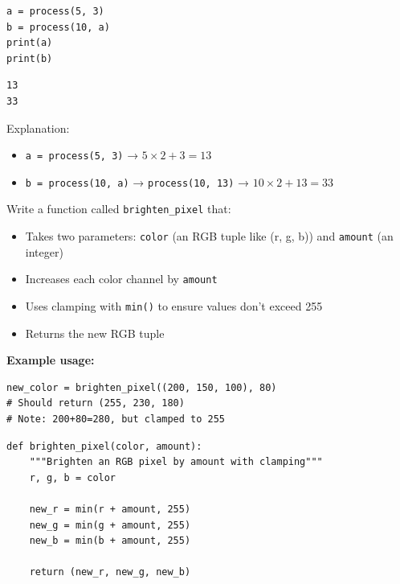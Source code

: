 \documentclass{csexam}
\begin{document}
\begin{questions}
\begin{lstlisting}
a = process(5, 3)
b = process(10, a)
print(a)
print(b)
\end{lstlisting}

\vspace{3cm}

\begin{solution}
\begin{verbatim}
13
33
\end{verbatim}
Explanation:
\begin{itemize}
    \item \texttt{a = process(5, 3)} → $5 \times 2 + 3 = 13$
    \item \texttt{b = process(10, a)} → \texttt{process(10, 13)} → $10 \times 2 + 13 = 33$
\end{itemize}
\end{solution}

\newpage

\question[12] Write a function called \texttt{brighten\_pixel} that:
\begin{itemize}
    \item Takes two parameters: \texttt{color} (an RGB tuple like (r, g, b)) and \texttt{amount} (an integer)
    \item Increases each color channel by \texttt{amount}
    \item Uses clamping with \texttt{min()} to ensure values don't exceed 255
    \item Returns the new RGB tuple
\end{itemize}

\textbf{Example usage:}
\begin{verbatim}
new_color = brighten_pixel((200, 150, 100), 80)
# Should return (255, 230, 180)
# Note: 200+80=280, but clamped to 255
\end{verbatim}

\vspace{8cm}

\begin{solution}
\begin{lstlisting}
def brighten_pixel(color, amount):
    """Brighten an RGB pixel by amount with clamping"""
    r, g, b = color

    new_r = min(r + amount, 255)
    new_g = min(g + amount, 255)
    new_b = min(b + amount, 255)

    return (new_r, new_g, new_b)
\end{lstlisting}
\end{solution}

\newpage


\end{questions}
\end{document}
